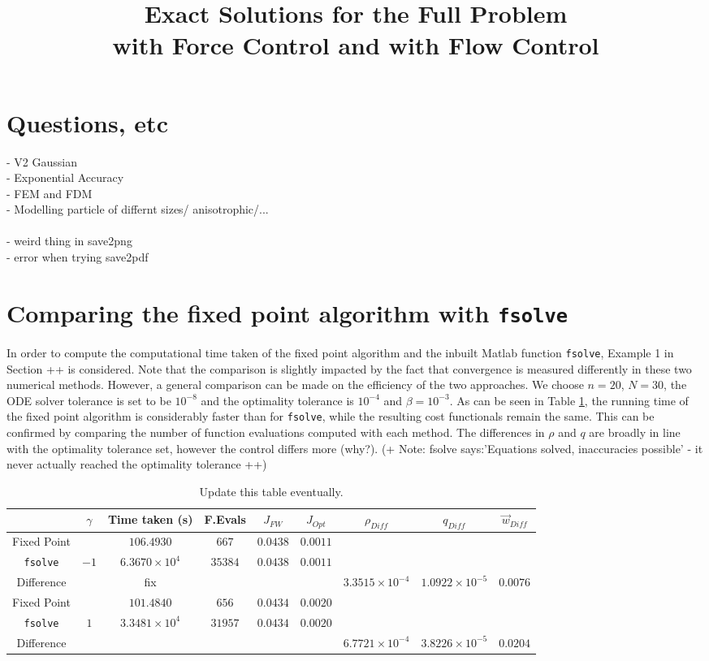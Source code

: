 \documentclass[11pt, a4paper]{article}
\title{Exact Solutions for the Full Problem \\with Force Control and with Flow Control}
\date{}
\theoremstyle{definition}
\begin{document}
\section{Questions, etc}
- V2 Gaussian\\
- Exponential Accuracy\\
- FEM and FDM\\
- Modelling particle of differnt sizes/ anisotrophic/...\\
\\
- weird thing in save2png\\
- error when trying save2pdf

\section{Comparing the fixed point algorithm with \texttt{fsolve}}
\label{app:fsolveComparison}

In order to compute the computational time taken of the fixed point algorithm and the inbuilt Matlab function \texttt{fsolve}, Example 1 in Section ++ is considered. Note that the comparison is slightly impacted by the fact that convergence is measured differently in these two numerical methods. However, a general comparison can be made on the efficiency of the two approaches.
We choose $n=20$, $N=30$, the ODE solver tolerance is set to be $10^{-8}$ and the optimality tolerance is $10^{-4}$ and $\beta = 10^{-3}$. 
As can be seen in Table \ref{TabApp3}, the running time of the fixed point algorithm is considerably faster than for \texttt{fsolve}, while the resulting cost functionals remain the same. This can be confirmed by comparing the number of function evaluations computed with each method. The differences in $\rho$ and $q$ are broadly in line with the optimality tolerance set, however the control differs more (why?). (+ Note: fsolve says:'Equations solved, inaccuracies possible' - it never actually reached the optimality tolerance ++)
\begin{table}[h]
	\begin{tabular}{ ||c|| c | c | c | c |c | c | c | c ||}
		\hline
		& $\gamma$ & Time taken (s) & F.Evals & $J_{FW}$ & $J_{Opt}$ & $\rho_{Diff}$ & $q_{Diff}$ & $\vec{w}_{Diff}$\\
		\hline
		Fixed Point & & $106.4930$ & $667$ & $0.0438$ & $0.0011$ & & & \\
		\texttt{fsolve} & $-1$ & $6.3670 \times 10^4$ & $35384$ & $0.0438$ & $0.0011$ & & & \\
		Difference &  & fix &  &  &  & $3.3515 \times 10^{-4}$ & $1.0922\times 10^{-5}$ & $0.0076$\\
		\hline
		Fixed Point & & $101.4840$ & $656$ & $0.0434$ & $0.0020$ & & & \\
		\texttt{fsolve} & $1$ & $3.3481 \times 10^4 $ & $31957$ & $0.0434$ & $0.0020$ & & & \\
		Difference &  &  &  &  &  & $6.7721 \times 10^{-4}$ & $3.8226 \times 10^{-5}$ & $0.0204$\\
		\hline        
	\end{tabular}
	\caption{Update this table eventually.}
	\label{TabApp3}
\end{table}
\end{document}

